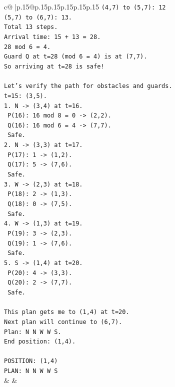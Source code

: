 \documentclass{article}
\begin{document}
{\begin{supertabular}{c@{$\;$}|p{.15\linewidth}@{}p{.15\linewidth}p{.15\linewidth}p{.15\linewidth}p{.15\linewidth}p{.15\linewidth}}
{{{\texttt{(4,7) to (5,7): 12} \\
\texttt{(5,7) to (6,7): 13.} \\
\texttt{Total 13 steps.} \\
\texttt{Arrival time: 15 + 13 = 28.} \\
\texttt{28 mod 6 = 4.} \\
\texttt{Guard Q at t=28 (mod 6 = 4) is at (7,7).} \\
\texttt{So arriving at t=28 is safe!} \\
\\ 
\texttt{Let's verify the path for obstacles and guards.} \\
\texttt{t=15: (3,5).} \\
\texttt{1. N {-}> (3,4) at t=16.} \\
\texttt{   P(16): 16 mod 8 = 0 {-}> (2,2).} \\
\texttt{   Q(16): 16 mod 6 = 4 {-}> (7,7).} \\
\texttt{   Safe.} \\
\texttt{2. N {-}> (3,3) at t=17.} \\
\texttt{   P(17): 1 {-}> (1,2).} \\
\texttt{   Q(17): 5 {-}> (7,6).} \\
\texttt{   Safe.} \\
\texttt{3. W {-}> (2,3) at t=18.} \\
\texttt{   P(18): 2 {-}> (1,3).} \\
\texttt{   Q(18): 0 {-}> (7,5).} \\
\texttt{   Safe.} \\
\texttt{4. W {-}> (1,3) at t=19.} \\
\texttt{   P(19): 3 {-}> (2,3).} \\
\texttt{   Q(19): 1 {-}> (7,6).} \\
\texttt{   Safe.} \\
\texttt{5. S {-}> (1,4) at t=20.} \\
\texttt{   P(20): 4 {-}> (3,3).} \\
\texttt{   Q(20): 2 {-}> (7,7).} \\
\texttt{   Safe.} \\
\\ 
\texttt{This plan gets me to (1,4) at t=20.} \\
\texttt{Next plan will continue to (6,7).} \\
\texttt{Plan: N N W W S.} \\
\texttt{End position: (1,4).} \\
\\ 
\texttt{POSITION: (1,4)} \\
\texttt{PLAN: N N W W S} \\
            }
        }
    }
    & & \\ \\


\end{supertabular}}
\end{document}
